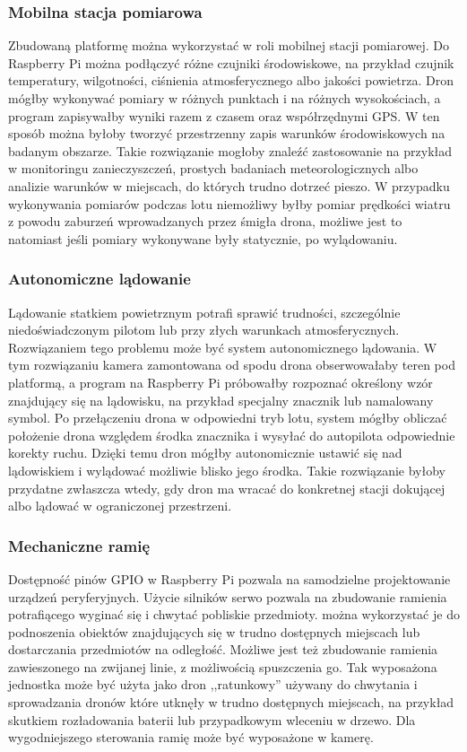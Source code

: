 \documentclass[a4paper,12pt]{book}
\begin{document}
    \subsubsection*{Mobilna stacja pomiarowa}
        Zbudowaną platformę można wykorzystać w roli mobilnej stacji pomiarowej. Do Raspberry Pi można podłączyć różne czujniki środowiskowe, na przykład czujnik temperatury, 
        wilgotności, ciśnienia atmosferycznego albo jakości powietrza. Dron mógłby wykonywać pomiary w różnych punktach i na różnych wysokościach, a program zapisywałby wyniki razem 
        z czasem oraz współrzędnymi GPS. W ten sposób można byłoby tworzyć przestrzenny zapis warunków środowiskowych na badanym obszarze. Takie rozwiązanie mogłoby znaleźć 
        zastosowanie na przykład w monitoringu zanieczyszczeń, prostych badaniach meteorologicznych albo analizie warunków w miejscach, do których trudno dotrzeć pieszo. W przypadku 
        wykonywania pomiarów podczas lotu niemożliwy byłby pomiar prędkości wiatru z powodu zaburzeń wprowadzanych przez śmigła drona, możliwe jest to natomiast jeśli pomiary wykonywane 
        były statycznie, po wylądowaniu.
    \subsubsection*{Autonomiczne lądowanie}
        Lądowanie statkiem powietrznym potrafi sprawić trudności, szczególnie niedoświadczonym pilotom lub przy złych warunkach atmosferycznych. Rozwiązaniem tego problemu może być 
        system autonomicznego lądowania. W tym rozwiązaniu kamera zamontowana od spodu drona obserwowałaby teren pod platformą, a program na Raspberry Pi próbowałby rozpoznać 
        określony wzór znajdujący się na lądowisku, na przykład specjalny znacznik lub namalowany symbol. Po przełączeniu drona w odpowiedni tryb lotu, system mógłby obliczać 
        położenie drona względem środka znacznika i wysyłać do autopilota odpowiednie korekty ruchu. Dzięki temu dron mógłby autonomicznie ustawić się nad lądowiskiem i wylądować 
        możliwie blisko jego środka. Takie rozwiązanie byłoby przydatne zwłaszcza wtedy, gdy dron ma wracać do konkretnej stacji dokującej albo lądować w ograniczonej przestrzeni.
    \subsubsection*{Mechaniczne ramię}
        Dostępność pinów GPIO w Raspberry Pi pozwala na samodzielne projektowanie urządzeń peryferyjnych. Użycie silników serwo pozwala na zbudowanie ramienia potrafiącego wyginać się i chwytać 
        pobliskie przedmioty. można wykorzystać je do podnoszenia obiektów znajdujących się w trudno dostępnych miejscach lub dostarczania przedmiotów na odległość. Możliwe jest też zbudowanie ramienia 
        zawieszonego na zwijanej linie, z możliwością spuszczenia go. Tak wyposażona jednostka może być użyta jako dron ,,ratunkowy'' używany do chwytania i sprowadzania dronów które utknęły w trudno dostępnych miejscach, 
        na przykład skutkiem rozładowania baterii lub przypadkowym wleceniu w drzewo. Dla wygodniejszego sterowania ramię może być wyposażone w kamerę.
\end{document}
